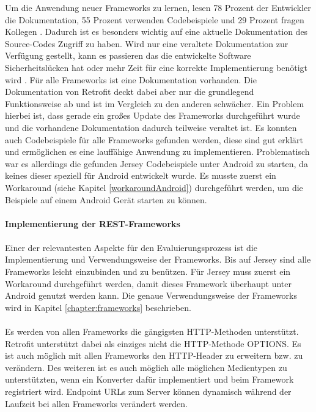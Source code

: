 Um die Anwendung neuer Frameworks zu lernen, lesen 78 Prozent der Entwickler die Dokumentation, 55 Prozent verwenden Codebeispiele und 29 Prozent fragen Kollegen \cite{robillard:apis}. Dadurch ist es besonders wichtig auf eine aktuelle Dokumentation des Source-Codes Zugriff zu haben. Wird nur eine veraltete Dokumentation zur Verfügung gestellt, kann es passieren das die entwickelte Software Sicherheitslücken hat oder mehr Zeit für eine korrekte Implementierung benötigt wird \cite{lethbridge:documentation}. Für alle Frameworks ist eine Dokumentation vorhanden. Die Dokumentation von Retrofit deckt dabei aber nur die grundlegend Funktionsweise ab und ist im Vergleich zu den anderen schwächer. Ein Problem hierbei ist, dass gerade ein großes Update des Frameworks durchgeführt wurde und die vorhandene Dokumentation dadurch teilweise veraltet ist. Es konnten auch Codebeispiele für alle Frameworks gefunden werden, diese sind gut erklärt und ermöglichen es eine lauffähige Anwendung zu implementieren. Problematisch war es allerdings die gefunden Jersey Codebeispiele unter Android zu starten, da keines dieser speziell für Android entwickelt wurde. Es musste zuerst ein Workaround (siehe Kapitel \ref{workaroundAndroid}) durchgeführt werden, um die Beispiele auf einem Android Gerät starten zu können.
\\\\
{\large \textbf{Implementierung der REST-Frameworks}}\\\\
Einer der relevantesten Aspekte für den Evaluierungsprozess ist die Implementierung und Verwendungsweise der Frameworks. Bis auf Jersey sind alle Frameworks leicht einzubinden und zu benützen. Für Jersey muss zuerst ein Workaround durchgeführt werden, damit dieses Framework überhaupt unter Android genutzt werden kann. Die genaue Verwendungsweise der Frameworks wird in Kapitel \ref{chapter:frameworks} beschrieben.
\\\\
Es werden von allen Frameworks die gängigsten HTTP-Methoden unterstützt. Retrofit unterstützt dabei als einziges nicht die HTTP-Methode OPTIONS. Es ist auch möglich mit allen Frameworks den HTTP-Header zu erweitern bzw. zu verändern. Des weiteren ist es auch möglich alle möglichen Medientypen zu unterstützten, wenn ein Konverter dafür implementiert und beim Framework registriert wird. Endpoint URLs zum Server können dynamisch während der Laufzeit bei allen Frameworks verändert werden. 
\\\\
